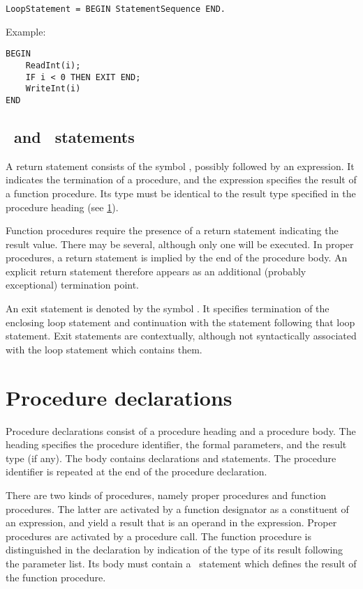 \documentclass[12pt]{article}
\begin{document}
\begin{lstlisting}[style=example]
LoopStatement = BEGIN StatementSequence END.
\end{lstlisting} 

Example:
\begin{lstlisting}[style=example]
BEGIN
    ReadInt(i);
    IF i < 0 THEN EXIT END; 
    WriteInt(i)
END
\end{lstlisting} 

\subsection{\RETURN\ and \EXIT\ statements}
\label{return}

A return statement consists of the symbol \RETURN, possibly followed by an expression. It indicates the termination of a procedure, and the expression specifies the result of a function procedure. Its type must be identical to the result type specified in the procedure heading (see \ref{procedures}).

Function procedures require the presence of a return statement indicating the result value. There may be several, although only one will be executed. In proper procedures, a return statement is implied by the end of the procedure body. An explicit return statement therefore appears as an additional (probably exceptional) termination point.

An exit statement is denoted by the symbol \EXIT. It specifies termination of the enclosing loop
statement and continuation with the statement following that loop statement. Exit statements are contextually, although not syntactically associated with the loop statement which contains them.

\section{Procedure declarations}
\label{procedures}

Procedure declarations consist of a procedure heading and a procedure body. The heading specifies the procedure identifier, the formal parameters, and the result type (if any). The body contains declarations and statements. The procedure identifier is repeated at the end of the procedure declaration.

There are two kinds of procedures, namely proper procedures and function procedures. The latter are activated by a function designator as a constituent of an expression, and yield a result that is an operand in the expression. Proper procedures are activated by a procedure call. The function procedure is distinguished in the declaration by indication of the type of its result following the parameter list. Its body must contain a \RETURN\ statement which defines the result of the function procedure.
\end{document}
